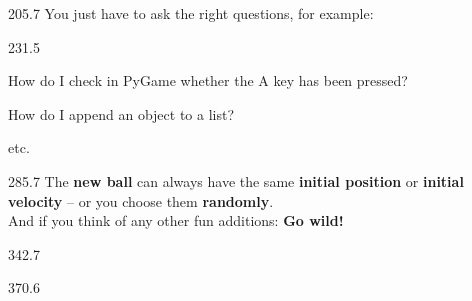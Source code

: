 \documentclass{aslab}
\begin{document}
\begin{region}{205.7}
You just have to ask the right questions, for example:
\end{region}

\begin{region}[pitch=13.2]{231.5}
\begin{dashlist}
\item How do I check in PyGame whether the A key has been pressed?
\item How do I append an object to a list?
\item etc.
\end{dashlist}
\end{region}

\begin{region}[pitch=14.25]{285.7}
The \textbf{new ball} can always have the same \textbf{initial position} or
\textbf{initial velocity} -- or you choose them \textbf{randomly}.\\
And if you think of any other fun additions: \textbf{Go wild!}
\end{region}

\begin{region}{342.7}
\end{region}

\begin{region}[pitch=13.2]{370.6}
\\
\end{region}
\end{document}
